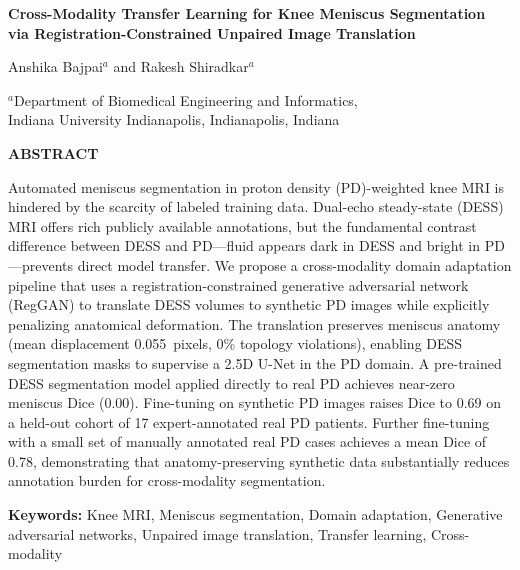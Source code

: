 \documentclass[12pt, a4paper]{article}
\begin{document}
\begin{center}
{\large\bfseries
Cross-Modality Transfer Learning for Knee Meniscus Segmentation\\
via Registration-Constrained Unpaired Image Translation}

\vspace{10pt}

Anshika Bajpai$^a$ and Rakesh Shiradkar$^a$

\vspace{6pt}

{\small $^a$Department of Biomedical Engineering and Informatics,\\
Indiana University Indianapolis, Indianapolis, Indiana}
\end{center}

\vspace{10pt}

\begin{center}\textbf{ABSTRACT}\end{center}

\noindent
Automated meniscus segmentation in proton density (PD)-weighted knee MRI is hindered by the scarcity of labeled training data. Dual-echo steady-state (DESS) MRI offers rich publicly available annotations, but the fundamental contrast difference between DESS and PD—fluid appears dark in DESS and bright in PD—prevents direct model transfer. We propose a cross-modality domain adaptation pipeline that uses a registration-constrained generative adversarial network (RegGAN) to translate DESS volumes to synthetic PD images while explicitly penalizing anatomical deformation. The translation preserves meniscus anatomy (mean displacement 0.055~pixels, 0\% topology violations), enabling DESS segmentation masks to supervise a 2.5D U-Net in the PD domain. A pre-trained DESS segmentation model applied directly to real PD achieves near-zero meniscus Dice (0.00). Fine-tuning on synthetic PD images raises Dice to 0.69 on a held-out cohort of 17 expert-annotated real PD patients. Further fine-tuning with a small set of manually annotated real PD cases achieves a mean Dice of 0.78, demonstrating that anatomy-preserving synthetic data substantially reduces annotation burden for cross-modality segmentation.

\vspace{6pt}
\noindent\textbf{Keywords:} Knee MRI, Meniscus segmentation, Domain adaptation, Generative adversarial networks, Unpaired image translation, Transfer learning, Cross-modality
\end{document}
